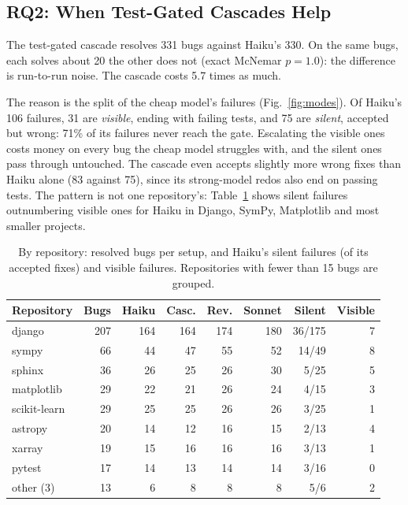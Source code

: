 \documentclass[10pt,conference]{IEEEtran}
\begin{document}
\subsection{RQ2: When Test-Gated Cascades Help}
The test-gated cascade resolves 331 bugs against Haiku's 330. On the same bugs, each solves about 20 the other does
not (exact McNemar $p=1.0$): the difference is run-to-run noise. The cascade costs 5.7 times as much.


The reason is the split of the cheap model's failures (Fig.~\ref{fig:modes}). Of Haiku's 106 failures, 31 are \emph{visible}, ending with
failing tests, and 75 are \emph{silent}, accepted but wrong: 71\% of its failures never reach the gate. Escalating the
visible ones costs money on every bug the cheap model struggles with, and the silent ones pass through untouched. The
cascade even accepts slightly more wrong fixes than Haiku alone (83 against 75), since its strong-model redos also
end on passing tests. The pattern is not one repository's: Table~\ref{tab:repo} shows silent failures outnumbering
visible ones for Haiku in Django, SymPy, Matplotlib and most smaller projects.

\begin{table}[t]
\caption{By repository: resolved bugs per setup, and Haiku's silent failures (of its accepted fixes) and visible
failures. Repositories with fewer than 15 bugs are grouped.}
\label{tab:repo}
\centering
\setlength{\tabcolsep}{3pt}
\begin{tabular}{@{}lrrrrrrr@{}}
\toprule
Repository & Bugs & Haiku & Casc. & Rev. & Sonnet & Silent & Visible \\
\midrule
django & 207 & 164 & 164 & 174 & 180 & 36/175 & 7 \\
sympy & 66 & 44 & 47 & 55 & 52 & 14/49 & 8 \\
sphinx & 36 & 26 & 25 & 26 & 30 & 5/25 & 5 \\
matplotlib & 29 & 22 & 21 & 26 & 24 & 4/15 & 3 \\
scikit-learn & 29 & 25 & 25 & 26 & 26 & 3/25 & 1 \\
astropy & 20 & 14 & 12 & 16 & 15 & 2/13 & 4 \\
xarray & 19 & 15 & 16 & 16 & 16 & 3/13 & 1 \\
pytest & 17 & 14 & 13 & 14 & 14 & 3/16 & 0 \\
other (3) & 13 & 6 & 8 & 8 & 8 & 5/6 & 2 \\
\bottomrule
\end{tabular}
\end{table}
\end{document}
